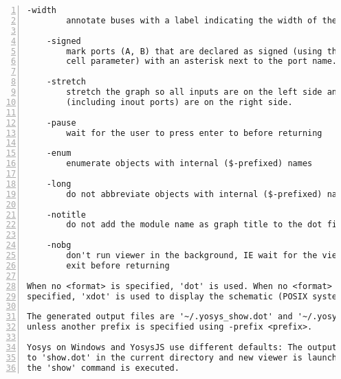 \begin{lstlisting}[numbers=left,frame=single]
    -width
        annotate buses with a label indicating the width of the bus.

    -signed
        mark ports (A, B) that are declared as signed (using the [AB]_SIGNED
        cell parameter) with an asterisk next to the port name.

    -stretch
        stretch the graph so all inputs are on the left side and all outputs
        (including inout ports) are on the right side.

    -pause
        wait for the user to press enter to before returning

    -enum
        enumerate objects with internal ($-prefixed) names

    -long
        do not abbreviate objects with internal ($-prefixed) names

    -notitle
        do not add the module name as graph title to the dot file

    -nobg
        don't run viewer in the background, IE wait for the viewer tool to
        exit before returning

When no <format> is specified, 'dot' is used. When no <format> and <viewer> is
specified, 'xdot' is used to display the schematic (POSIX systems only).

The generated output files are '~/.yosys_show.dot' and '~/.yosys_show.<format>',
unless another prefix is specified using -prefix <prefix>.

Yosys on Windows and YosysJS use different defaults: The output is written
to 'show.dot' in the current directory and new viewer is launched each time
the 'show' command is executed.
\end{lstlisting}

